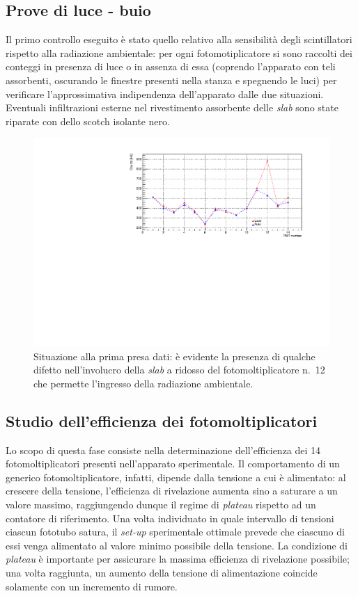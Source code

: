 \documentclass[10pt, oneside, a4paper]{article}   	%
\begin{document}
\subsection{Prove di luce - buio}
Il primo controllo eseguito è stato quello relativo alla sensibilità degli scintillatori rispetto alla radiazione ambientale: per ogni fotomotiplicatore si sono raccolti dei conteggi in presenza di luce o in assenza di essa (coprendo l'apparato con teli assorbenti, oscurando le finestre presenti nella stanza e spegnendo le luci) per verificare l'approssimativa indipendenza dell'apparato dalle due situazioni. Eventuali infiltrazioni esterne nel rivestimento assorbente delle \emph{slab} sono state riparate con dello scotch isolante nero. 
%
\begin{figure}[h]
	\centering
	\includegraphics[scale=0.6]{img/luce_buio_100s.pdf}
	\caption{Situazione alla prima presa dati: è evidente la presenza di qualche difetto  nell'involucro della \emph{slab} a ridosso del fotomoltiplicatore n.~12 che permette l'ingresso della radiazione ambientale.}
\end{figure}
%
\subsection{Studio dell'efficienza dei fotomoltiplicatori}
Lo scopo di questa fase consiste nella determinazione dell'efficienza dei 14 fotomoltiplicatori presenti nell'apparato sperimentale. Il comportamento di un generico fotomoltiplicatore, infatti, dipende dalla tensione a cui è alimentato: al crescere della tensione, l'efficienza di rivelazione aumenta sino a saturare a un valore massimo, raggiungendo dunque il regime di \textit{plateau} rispetto ad un contatore di riferimento.
Una volta individuato in quale intervallo di tensioni ciascun fototubo satura, il \emph{set-up} sperimentale ottimale prevede che ciascuno di essi venga alimentato al valore minimo possibile della tensione. 
La condizione di \textit{plateau} è importante per assicurare la massima efficienza di rivelazione possibile; una volta raggiunta, un aumento della tensione di alimentazione coincide solamente con un incremento di rumore.  
\end{document}
